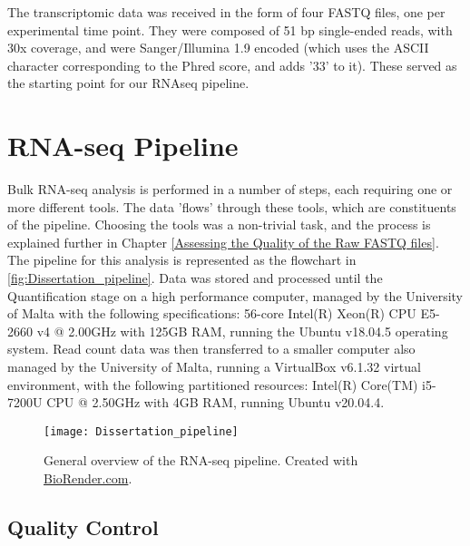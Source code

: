 The transcriptomic data was received in the form of four FASTQ \citep{FASTQ} files, one per experimental time point. They were composed of 51  \ac{bp} single-ended reads, with 30x coverage, and were Sanger/Illumina 1.9 encoded (which uses the ASCII character corresponding to the Phred score, and adds '33' to it). These served as the starting point for our RNAseq pipeline.

\section{RNA-seq Pipeline}%

\iffalse 
Tool versions:
MultiQC v1.11
STAR 2.7.9a
RSEM v1.3.3
EdgeR
Other R packages?
\fi

Bulk RNA-seq analysis is performed in a number of steps, each requiring one or more different tools. The data 'flows' through these tools, which are constituents of the pipeline. Choosing the tools was a non-trivial task, and the process is explained further in Chapter \ref{Assessing the Quality of the Raw FASTQ files}. The pipeline for this analysis is represented as the flowchart in \autoref{fig:Dissertation_pipeline}.
Data was stored and processed until the Quantification stage on a high performance computer, managed by the University of Malta with the following specifications: 56-core Intel(R) Xeon(R) CPU E5-2660 v4 @ 2.00GHz with 125GB RAM, running the Ubuntu v18.04.5 operating system. Read count data was then transferred to a smaller computer also managed by the University of Malta, running a VirtualBox v6.1.32 \citep{virtualbox} virtual environment, with the following partitioned resources: Intel(R) Core(TM) i5-7200U CPU @ 2.50GHz with 4GB RAM, running Ubuntu v20.04.4.

\begin{figure}[!ht]
    \centering
    \texttt{[image: Dissertation\_pipeline]}
    \caption[General overview of the RNA-seq pipeline.]{General overview of the RNA-seq pipeline. Created with \href{https://biorender.com/}{BioRender.com}.} 
    \label{fig:Dissertation_pipeline}
\end{figure}

\clearpage
\subsection{Quality Control}%

